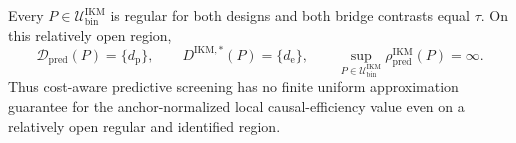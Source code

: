 Every \(P\in\mathcal U_{\mathrm{bin}}^{\mathrm{IKM}}\) is regular for both designs and both bridge contrasts equal \(\tau\).  On this relatively open region,
\[
 \mathcal D_{\mathrm{pred}}(P)=\{d_{\mathrm p}\},
 \qquad
 D^{\mathrm{IKM},*}(P)=\{d_{\mathrm e}\},
 \qquad
 \sup_{P\in\mathcal U_{\mathrm{bin}}^{\mathrm{IKM}}}
 \rho_{\mathrm{pred}}^{\mathrm{IKM}}(P)=\infty.
\]
Thus cost-aware predictive screening has no finite uniform approximation guarantee for the anchor-normalized local causal-efficiency value even on a relatively open regular and identified region.